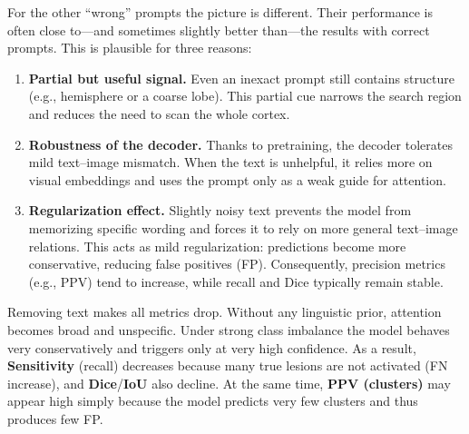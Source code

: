 \documentclass[a4paper,12pt]{article}
\begin{document}
For the other ``wrong'' prompts the picture is different. Their performance is often close to---and sometimes slightly better than---the results with correct prompts. This is plausible for three reasons:
\begin{enumerate}
  \item \textbf{Partial but useful signal.} Even an inexact prompt still contains structure (e.g., hemisphere or a coarse lobe). This partial cue narrows the search region and reduces the need to scan the whole cortex.
  \item \textbf{Robustness of the decoder.} Thanks to pretraining, the decoder tolerates mild text--image mismatch. When the text is unhelpful, it relies more on visual embeddings and uses the prompt only as a weak guide for attention.
  \item \textbf{Regularization effect.} Slightly noisy text prevents the model from memorizing specific wording and forces it to rely on more general text–image relations. This acts as mild regularization: predictions become more conservative, reducing false positives (FP). Consequently, precision metrics (e.g., PPV) tend to increase, while recall and Dice typically remain stable.
    
\end{enumerate}

Removing text makes all metrics drop. Without any linguistic prior, attention becomes broad and unspecific. Under strong class imbalance the model behaves very conservatively and triggers only at very high confidence. As a result, \textbf{Sensitivity} (recall) decreases because many true lesions are not activated (FN increase), and \textbf{Dice}/\textbf{IoU} also decline. At the same time, \textbf{PPV (clusters)} may appear high simply because the model predicts very few clusters and thus produces few FP.
\end{document}
